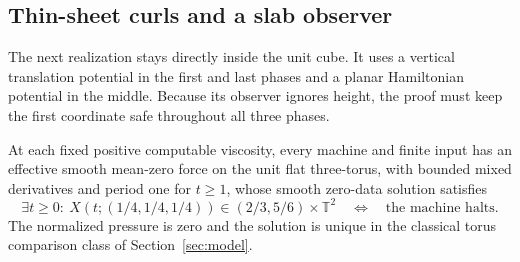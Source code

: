 \subsection{Thin-sheet curls and a slab observer}
\label{ba:thin-sheet}

The next realization stays directly inside the unit cube.  It uses a
vertical translation potential in the first and last phases and a planar
Hamiltonian potential in the middle.  Because its observer ignores
height, the proof must keep the first coordinate safe throughout all
three phases.

\begin{theorem}
\label{ba:thin-sheet-torus}
At each fixed positive computable viscosity, every machine and finite
input has an effective smooth mean-zero force on the unit flat
three-torus, with bounded mixed derivatives and period one for $t\ge1$,
whose smooth zero-data solution satisfies
\[
 \exists t\ge0:\ X(t;(1/4,1/4,1/4))\in
 (2/3,5/6)\times\mathbb T^2
 \quad\Longleftrightarrow\quad\text{the machine halts}.
\]
The normalized pressure is zero and the solution is unique in the
classical torus comparison class of Section~\ref{sec:model}.
\end{theorem}

